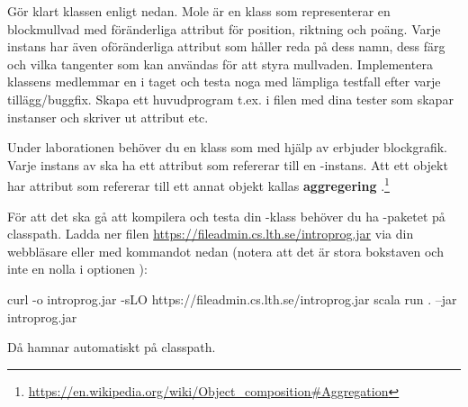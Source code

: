\Subtask Gör klart klassen  enligt nedan. Mole är en klass som representerar en blockmullvad med föränderliga attribut för position, riktning och poäng. Varje instans har även oföränderliga attribut som håller reda på dess namn, dess färg och vilka tangenter som kan användas för att styra mullvaden. Implementera klassens medlemmar en i taget och testa noga med lämpliga testfall efter varje tillägg/buggfix. Skapa ett huvudprogram t.ex. i filen  med dina tester som skapar instanser och skriver ut attribut etc. 
%
%
%
%
%



\Subtask Under laborationen behöver du en klass  som med hjälp av  erbjuder blockgrafik. Varje instans av  ska ha ett attribut som refererar till en -instans. Att ett objekt har attribut som refererar till ett annat objekt kallas \textbf{aggregering} .\footnote{\url{https://en.wikipedia.org/wiki/Object\_composition\#Aggregation}}

För att det ska gå att kompilera och testa din -klass behöver du ha -paketet på classpath. Ladda ner filen \url{https://fileadmin.cs.lth.se/introprog.jar} via din webbläsare eller med kommandot  nedan (notera att det är stora bokstaven  och inte en nolla i optionen ):

\begin{REPLnonum}
curl -o introprog.jar -sLO  https://fileadmin.cs.lth.se/introprog.jar
scala run . --jar introprog.jar
\end{REPLnonum}
Då hamnar  automatiskt på classpath. 

